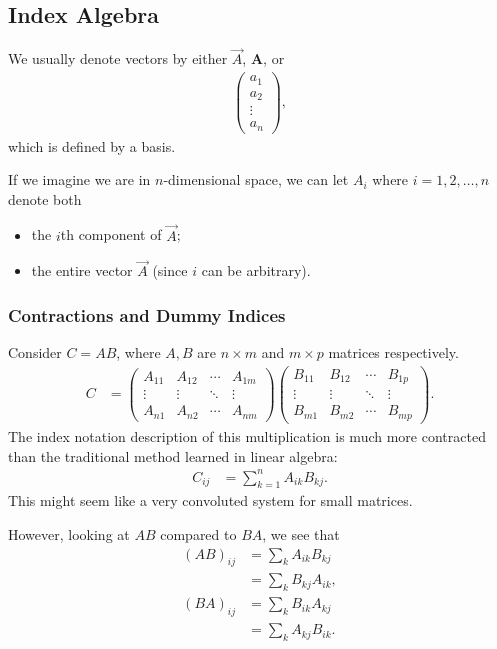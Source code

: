 \documentclass[10pt]{mypackage}
\begin{document}
\subsection{Index Algebra}%
We usually denote vectors by either $\vec{A}$, $\mathbf{A}$, or
\begin{align*}
  \begin{pmatrix}a_1\\a_2\\\vdots\\a_n\end{pmatrix},
\end{align*}
which is defined by a basis.\newline

If we imagine we are in $n$-dimensional space, we can let $A_i$ where $i = 1,2,\dots,n$ denote both
\begin{itemize}
  \item the $i$th component of $\vec A$;
  \item the entire vector $\vec{A}$ (since $i$ can be arbitrary).
\end{itemize}
\subsubsection{Contractions and Dummy Indices}%
Consider $C = AB$, where $A,B $ are $n\times m$ and $m\times p$ matrices respectively.
\begin{align*}
  C &= \begin{pmatrix}A_{11} & A_{12} & \cdots & A_{1m}\\
  \vdots & \vdots & \ddots & \vdots\\
A_{n1} & A_{n2} & \cdots & A_{nm}\end{pmatrix} \begin{pmatrix}B_{11} & B_{12} & \cdots & B_{1p}\\
  \vdots & \vdots & \ddots & \vdots\\
B_{m1} & B_{m2} & \cdots & B_{mp}\end{pmatrix}.
\end{align*}
The index notation description of this multiplication is much more contracted than the traditional method learned in linear algebra:
\begin{align*}
  C_{ij} &= \sum_{k=1}^{n} A_{ik}B_{kj}.
\end{align*}
This might seem like a very convoluted system for small matrices.\newline

However, looking at $AB$ compared to $BA$, we see that
\begin{align*}
  \left(AB\right)_{ij} &= \sum_{k} A_{ik}B_{kj}\\
                       &= \sum_{k}B_{kj}A_{ik},\\
  \left(BA\right)_{ij} &= \sum_{k}B_{ik}A_{kj}\\
                       &= \sum_{k}A_{kj}B_{ik}.
\end{align*}
\end{document}
